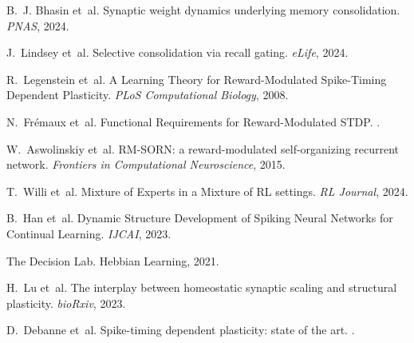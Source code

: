 \documentclass[12pt]{article}
\begin{document}
\begin{thebibliography}{20}
B.~J. Bhasin et~al.
\newblock Synaptic weight dynamics underlying memory consolidation.
\newblock \emph{PNAS}, 2024.

J.~Lindsey et~al.
\newblock Selective consolidation via recall gating.
\newblock \emph{eLife}, 2024.

R.~Legenstein et~al.
\newblock A Learning Theory for Reward-Modulated Spike-Timing Dependent Plasticity.
\newblock \emph{PLoS Computational Biology}, 2008.

N.~Fr{\'e}maux et~al.
\newblock Functional Requirements for Reward-Modulated STDP.
.

W.~Aswolinskiy et~al.
\newblock RM-SORN: a reward-modulated self-organizing recurrent network.
\newblock \emph{Frontiers in Computational Neuroscience}, 2015.

T.~Willi et~al.
\newblock Mixture of Experts in a Mixture of RL settings.
\newblock \emph{RL Journal}, 2024.

B.~Han et~al.
\newblock Dynamic Structure Development of Spiking Neural Networks for Continual Learning.
\newblock \emph{IJCAI}, 2023.

The Decision Lab.
\newblock Hebbian Learning, 2021.

H.~Lu et~al.
\newblock The interplay between homeostatic synaptic scaling and structural plasticity.
\newblock \emph{bioRxiv}, 2023.

D.~Debanne et~al.
\newblock Spike-timing dependent plasticity: state of the art.
.

\end{thebibliography}
\end{document}
